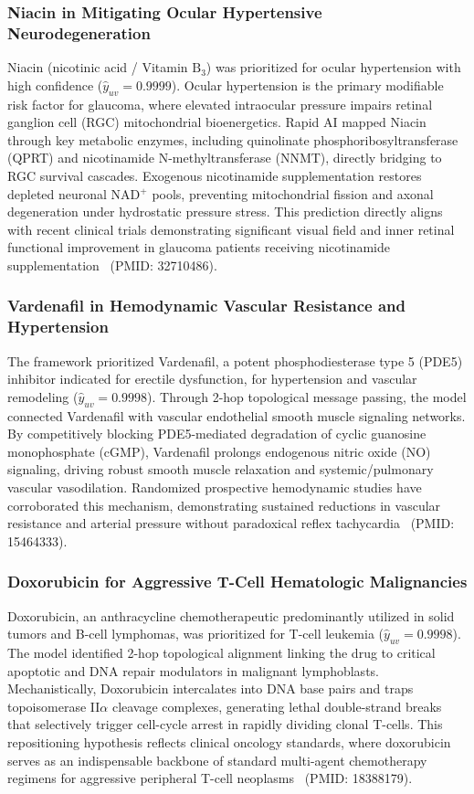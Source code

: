 \documentclass[preprint,12pt]{elsarticle}
\begin{document}
\subsubsection{Niacin in Mitigating Ocular Hypertensive Neurodegeneration}
Niacin (nicotinic acid / Vitamin $\text{B}_3$) was prioritized for ocular hypertension with high confidence ($\hat{y}_{uv} = 0.9999$). Ocular hypertension is the primary modifiable risk factor for glaucoma, where elevated intraocular pressure impairs retinal ganglion cell (RGC) mitochondrial bioenergetics. Rapid AI mapped Niacin through key metabolic enzymes, including quinolinate phosphoribosyltransferase (QPRT) and nicotinamide N-methyltransferase (NNMT), directly bridging to RGC survival cascades. Exogenous nicotinamide supplementation restores depleted neuronal NAD$^+$ pools, preventing mitochondrial fission and axonal degeneration under hydrostatic pressure stress. This prediction directly aligns with recent clinical trials demonstrating significant visual field and inner retinal functional improvement in glaucoma patients receiving nicotinamide supplementation~\cite{ref_niacin} (PMID: 32710486).

\subsubsection{Vardenafil in Hemodynamic Vascular Resistance and Hypertension}
The framework prioritized Vardenafil, a potent phosphodiesterase type 5 (PDE5) inhibitor indicated for erectile dysfunction, for hypertension and vascular remodeling ($\hat{y}_{uv} = 0.9998$). Through 2-hop topological message passing, the model connected Vardenafil with vascular endothelial smooth muscle signaling networks. By competitively blocking PDE5-mediated degradation of cyclic guanosine monophosphate (cGMP), Vardenafil prolongs endogenous nitric oxide (NO) signaling, driving robust smooth muscle relaxation and systemic/pulmonary vascular vasodilation. Randomized prospective hemodynamic studies have corroborated this mechanism, demonstrating sustained reductions in vascular resistance and arterial pressure without paradoxical reflex tachycardia~\cite{ref_vardenafil} (PMID: 15464333).

\subsubsection{Doxorubicin for Aggressive T-Cell Hematologic Malignancies}
Doxorubicin, an anthracycline chemotherapeutic predominantly utilized in solid tumors and B-cell lymphomas, was prioritized for T-cell leukemia ($\hat{y}_{uv} = 0.9998$). The model identified 2-hop topological alignment linking the drug to critical apoptotic and DNA repair modulators in malignant lymphoblasts. Mechanistically, Doxorubicin intercalates into DNA base pairs and traps topoisomerase II$\alpha$ cleavage complexes, generating lethal double-strand breaks that selectively trigger cell-cycle arrest in rapidly dividing clonal T-cells. This repositioning hypothesis reflects clinical oncology standards, where doxorubicin serves as an indispensable backbone of standard multi-agent chemotherapy regimens for aggressive peripheral T-cell neoplasms~\cite{ref_doxorubicin} (PMID: 18388179).
\end{document}
